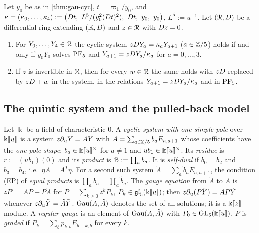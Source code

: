 \begin{cor}[The cyclic system is $\PFfive$; {\Lr{cor:gau-cycsys}}, for $y_1=\varpi_1$]
\label{cor:gau-cycsys}
Let $y_0$ be as in \cref{thm:gau-cyc}, $t=\varpi_1/y_0$, and $\kappa=(\kappa_0,\dots,\kappa_4):=\bigl(\Dq t,\ L^5/(y_0^2(\Dq t)^2),\ \Dq t,\ y_0,\ y_0\bigr)$, $L^5:=u^{-1}$. Let $(\mathcal{R},D)$ be a differential ring extending $(\mathbb{K},D)$ and $z\in\mathcal{R}$ with $D z=0$.
\begin{enumerate}
\item For $Y_0,\dots,Y_4\in\mathcal{R}$ the cyclic system $zD Y_a=\kappa_aY_{a+1}$ ($a\in\mathbb{Z}/5$) holds if and only if $y_0Y_0$ solves $\PFfive$ and $Y_{a+1}=zD Y_a/\kappa_a$ for $a=0,\dots,3$.
\item If $z$ is invertible in $\mathcal{R}$, then for every $w\in\mathcal{R}$ the same holds with $zD$ replaced by $zD+w$ in the system, in the relations $Y_{a+1}=zD Y_a/\kappa_a$ and in $\PFfive$.
\end{enumerate}
\end{cor}



\subsection{The quintic system and the pulled-back model}
\label{sec:gau-systems}

\begin{defn}
\label{def:gau-onepole}
Let $\Bbbk$ be a field of characteristic $0$. A \emph{cyclic system with one simple pole} over $\Bbbk[\![ u ]\!]$ is a system $z\partial_uY=AY$ with $A=\sum_{a\in\mathbb{Z}/5}b_aE_{a,a+1}$ whose coefficients have the \emph{one-pole shape}: $b_a\in\Bbbk[\![ u ]\!]^\times$ for $a\neq1$ and $ub_1\in\Bbbk[\![ u ]\!]^\times$. Its \emph{residue} is $r:=(ub_1)(0)$ and its \emph{product} is $\mathcal{B}:=\prod_ab_a$. It is \emph{self-dual} if $b_0=b_2$ and $b_3=b_4$, i.e.\ $\eta A=A^T\eta$. For a second such system $\tilde A=\sum_a\tilde b_aE_{a,a+1}$, the condition (EP) of \emph{equal products} is $\prod_ab_a=\prod_a\tilde b_a$. The \emph{gauge equation} from $\tilde A$ to $A$ is $zP'=AP-P\tilde A$ for $P=\sum_{k\geq0}z^kP_k$, $P_k\in\mathfrak{gl}_5(\Bbbk[\![ u ]\!])$; then $z\partial_u(P\tilde Y)=AP\tilde Y$ whenever $z\partial_u\tilde Y=\tilde A\tilde Y$. $\operatorname{Gau}(A,\tilde A)$ denotes the set of all solutions; it is a $\Bbbk[\![ z ]\!]$-module. A \emph{regular gauge} is an element of $\operatorname{Gau}(A,\tilde A)$ with $P_0\in\mathrm{GL}_5(\Bbbk[\![ u ]\!])$. $P$ is \emph{graded} if $P_k=\sum_bp_{k,b}E_{b+k,b}$ for every $k$.
\end{defn}

